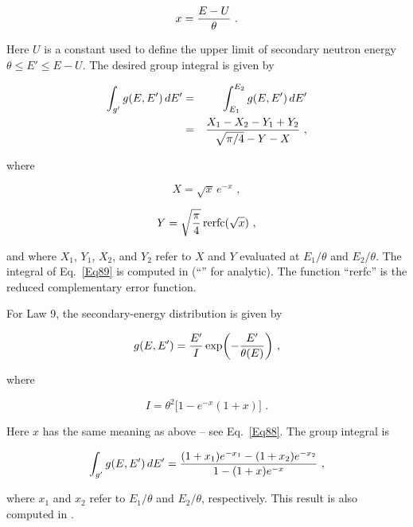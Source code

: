   \begin{equation}
    x={{E-U}\over \theta}\,\,.
  \label{Eq88}
  \end{equation}
\vspace{0.5 pt}

\noindent
Here $U$ is a constant used to define the upper limit of secondary
neutron energy $\theta \le E' \le E{-}U$.  The desired group integral
is given by

  \begin{eqnarray}
    \int_{g'}g(E,E')\,dE'&=&
    \int_{E_1}^{E_2}g(E,E')\,dE'\nonumber\\
    &=& {{X_1-X_2-Y_1+Y_2}\over{\sqrt{\pi/4}-Y-X}}\,\,,
  \label{Eq89}
  \end{eqnarray}

\noindent
where

  \begin{equation}
    X=\sqrt{x}\,e^{-x}\,\,,
  \end{equation}

  \begin{equation}
    Y=\sqrt{\pi \over 4}\,{\rm rerfc}(\sqrt{x})\,\,,
  \end{equation}

\noindent
and where $X_1$, $Y_1$, $X_2$, and $Y_2$ refer to $X$ and $Y$
evaluated at $E_1/\theta$ and $E_2/\theta$.  The integral of
Eq.~\ref{Eq89} is computed in 
(``'' for analytic).  The function ``rerfc'' is the reduced
complementary error function\cite{ref13}.

For Law 9, the secondary-energy distribution is given by

  \begin{equation}
    g(E,E')={{E'}\over{I}}\exp \biggl(-{{E'}\over{\theta(E)}} \biggr)\,\,,
  \end{equation}

\noindent
where

  \begin{equation}
    I=\theta^2 \bigl[ 1-e^{-x}(1+x) \bigr]\,\,.
  \end{equation}

\noindent
Here $x$ has the same meaning as above -- see Eq.~\ref{Eq88}.  The
group integral is

  \begin{equation}
    \int_{g'}g(E,E')\,dE'={{(1+x_1)e^{-x_1}-(1+x_2)e^{-x_2}}
    \over{1-(1+x)e^{-x}}}\,\,,
  \end{equation}

\noindent
where $x_1$ and $x_2$ refer to $E_1/\theta$ and $E_2/\theta$, respectively.
This result is also computed in .

